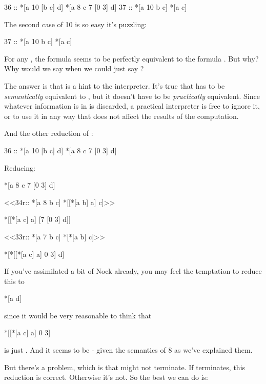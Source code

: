 \begin{code}
36 ::    *[a 10 [b c] d]  *[a 8 c 7 [0 3] d]
37 ::    *[a 10 b c]      *[a c]
\end{code}
The second case of 10 is so easy it's puzzling:

\begin{code}
37 ::    *[a 10 b c]      *[a c]
\end{code}
For any , the formula \kode{[10 b c]} seems to be perfectly
equivalent to the formula .  But why?  Why would we say
\kode{[10 b c]} when we could just say ?

The answer is that  is a hint to the interpreter.  It's true
that \kode{[10 b c]} has to be \emph{semantically} equivalent to , but
it doesn't have to be \emph{practically} equivalent.  Since whatever
information is in  is discarded, a practical interpreter is
free to ignore it, or to use it in any way that does not affect
the results of the computation.

And the other reduction of :

\begin{code}
    36 ::    *[a 10 [b c] d]  *[a 8 c 7 [0 3] d]
\end{code}
Reducing:

\begin{code}
*[a 8 c 7 [0 3] d]

  <<34r::    *[a 8 b c]       *[[*[a b] a] c]>>

*[[*[a c] a] [7 [0 3] d]]

  <<33r::    *[a 7 b c]       *[*[a b] c]>>

*[*[[*[a c] a] 0 3] d]
\end{code}
If you've assimilated a bit of Nock already, you may feel the
temptation to reduce this to

\begin{code}
*[a d]
\end{code}
since it would be very reasonable to think that

\begin{code}
*[[*[a c] a] 0 3]
\end{code}

is just .  And it seems to be - given the semantics of 8 as
we've explained them.

But there's a problem, which is that  might not terminate.
If  terminates, this reduction is correct.  Otherwise it's not. 
So the best we can do is:

